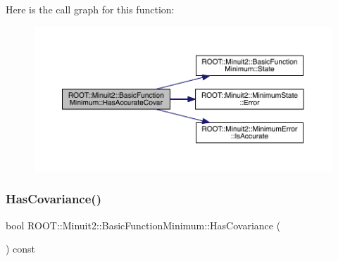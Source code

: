 Here is the call graph for this function\+:
\nopagebreak
\begin{figure}[H]
\begin{center}
\leavevmode
\includegraphics[width=350pt]{de/d25/classROOT_1_1Minuit2_1_1BasicFunctionMinimum_acc1e5d50ec4abe632af93c5dcebd9c0e_cgraph}
\end{center}
\end{figure}
\mbox{\label{classROOT_1_1Minuit2_1_1BasicFunctionMinimum_ac876224368add09ceab711d3515fd959}} 
\subsubsection{\texorpdfstring{HasCovariance()}{HasCovariance()}\hspace{0.1cm}{\footnotesize\ttfamily [1/2]}}
{\footnotesize\ttfamily bool R\+O\+O\+T\+::\+Minuit2\+::\+Basic\+Function\+Minimum\+::\+Has\+Covariance (\begin{DoxyParamCaption}{ }\end{DoxyParamCaption}) const\hspace{0.3cm}{\ttfamily [inline]}}

